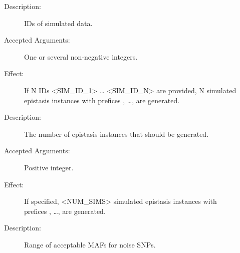 \documentclass[a4paper,10pt,english]{sphinxhowto}
\begin{document}
\begin{description}
\begin{description}
\end{description}

\item[{\sphinxstylestrong{Required Group of Mutually Exclusive Arguments:}}] \leavevmode\begin{description}
\item[{}] \leavevmode\begin{description}
\item[{Description:}] \leavevmode
IDs of simulated data.

\item[{Accepted Arguments:}] \leavevmode
One or several non-negative integers.

\item[{Effect:}] \leavevmode
If N IDs \textless{}SIM\_ID\_1\textgreater{} … \textless{}SIM\_ID\_N\textgreater{} are provided, N simulated epistasis instances with prefices
, …,  are generated.

\end{description}

\item[{}] \leavevmode\begin{description}
\item[{Description:}] \leavevmode
The number of epistasis instances that should be generated.

\item[{Accepted Arguments:}] \leavevmode
Positive integer.

\item[{Effect:}] \leavevmode
If specified, \textless{}NUM\_SIMS\textgreater{} simulated epistasis instances with prefices
, …,  are generated.

\end{description}

\end{description}

\item[{\sphinxstylestrong{Optional Arguments:}}] \leavevmode\begin{description}
\item[{}] \leavevmode\begin{description}
\item[{Description:}] \leavevmode
Range of acceptable MAFs for noise SNPs.


\end{description}
\end{description}
\end{description}
\end{document}
